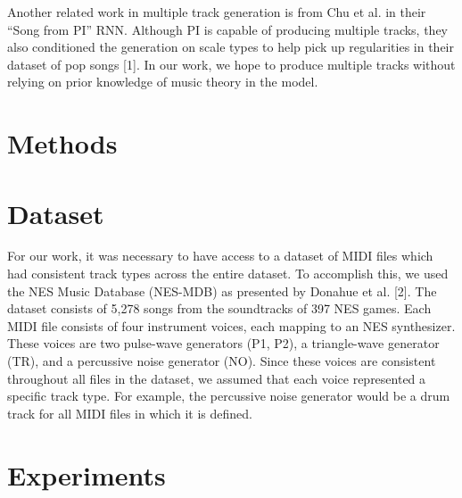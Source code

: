 \documentclass{article}
\begin{document}
Another related work in multiple track generation is from Chu et al. in their “Song from PI” RNN. Although PI is capable of producing multiple tracks, they also conditioned the generation on scale types to help pick up regularities in their dataset of pop songs [1]. In our work, we hope to produce multiple tracks without relying on prior knowledge of music theory in the model.


\section{Methods}




\section{Dataset}


For our work, it was necessary to have access to a dataset of MIDI files which had consistent track types across the entire dataset. To accomplish this, we used the NES Music Database (NES-MDB) as presented by Donahue et al. [2]. The dataset consists of 5,278 songs from the soundtracks of 397 NES games. Each MIDI file consists of four instrument voices, each mapping to an NES synthesizer. These voices are two pulse-wave generators (P1, P2), a triangle-wave generator (TR), and a percussive noise generator (NO). Since these voices are consistent throughout all files in the dataset, we assumed that each voice represented a specific track type. For example, the percussive noise generator would be a drum track for all MIDI files in which it is defined.


\section{Experiments}
\end{document}
